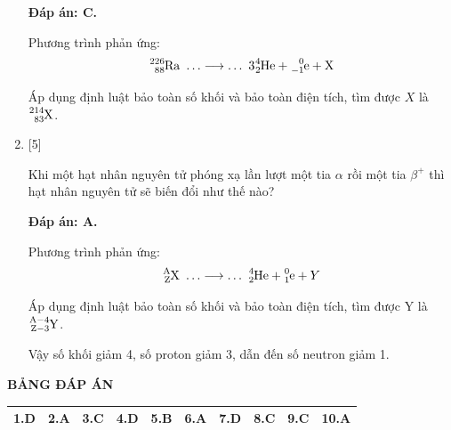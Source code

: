 \begin{enumerate}[label=\bfseries Câu \arabic*:]
\loigiai
{		\textbf{Đáp án: C.}
	
	Phương trình phản ứng:
	$$\ce{^226_88 Ra}\ \ldots \longrightarrow \ldots\ 3 \ce{^4_2 He} + \ce{^0_{-1} e} + \ce{X}$$
	
	Áp dụng định luật bảo toàn số khối và bảo toàn điện tích, tìm được $X$ là $\ce{^214_83 X}$.
	
}
	\item {} [5]

\cauhoi
{Khi một hạt nhân nguyên tử phóng xạ lần lượt một tia $\alpha$ rồi một tia $\beta^+$ thì hạt nhân nguyên tử sẽ biến đổi như thế nào?
}

\loigiai
{		\textbf{Đáp án: A.}
	
	Phương trình phản ứng:
	$$\ce{^A_Z X}\ \ldots \longrightarrow \ldots\ \ce{^4_2 He} + \ce{^0_1 e} + Y$$
	
	Áp dụng định luật bảo toàn số khối và bảo toàn điện tích, tìm được Y là $\ce{^{A-4}_{Z-3} Y}$.
	
	Vậy số khối giảm 4, số proton giảm 3, dẫn đến số neutron giảm 1.
	
}

\end{enumerate}

\loigiai
{
	\begin{center}
		\textbf{BẢNG ĐÁP ÁN}
	\end{center}
	\begin{center}
		\begin{tabular}{|m{2.8em}|m{2.8em}|m{2.8em}|m{2.8em}|m{2.8em}|m{2.8em}|m{2.8em}|m{2.8em}|m{2.8em}|m{2.8em}|}
			\hline
			1.D  & 2.A  & 3.C  & 4.D  & 5.B  & 6.A  & 7.D & 8.C & 9.C & 10.A \\
			\hline
			
		\end{tabular}
	\end{center}
}

